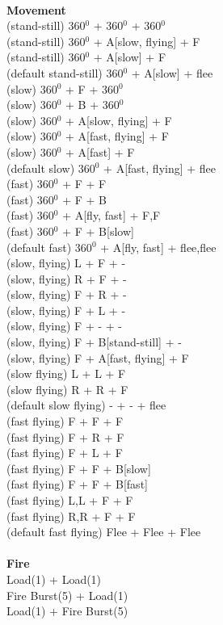 \ \\ {\bf Movement } \\
(stand-still) 360$^0$ + 360$^0$ + 360$^0$ \\
(stand-still) 360$^0$ + A[slow, flying] + F \\
(stand-still) 360$^0$ + A[slow] + F \\
(default stand-still) 360$^0$ + A[slow] + flee \\
(slow) 360$^0$ + F + 360$^0$ \\
(slow) 360$^0$ + B + 360$^0$ \\
(slow) 360$^0$ + A[slow, flying] + F \\
(slow) 360$^0$ + A[fast, flying] + F \\
(slow) 360$^0$ + A[fast] + F \\
(default slow) 360$^0$ + A[fast, flying] + flee \\
(fast) 360$^0$ + F + F \\
(fast) 360$^0$ + F + B \\
(fast) 360$^0$ + A[fly, fast] + F,F \\
(fast) 360$^0$ + F + B[slow] \\
(default fast) 360$^0$ + A[fly, fast] + flee,flee \\
(slow, flying) L + F + - \\
(slow, flying) R + F + - \\
(slow, flying) F + R + - \\
(slow, flying) F + L + - \\
(slow, flying) F + - + - \\
(slow, flying) F + B[stand-still] + - \\
(slow, flying) F + A[fast, flying] + F \\
(slow flying) L + L + F \\
(slow flying) R + R + F \\
(default slow flying) - + - + flee \\
(fast flying) F + F + F \\
(fast flying) F + R + F \\
(fast flying) F + L + F \\
(fast flying) F + F + B[slow] \\
(fast flying) F + F + B[fast] \\
(fast flying) L,L + F + F \\
(fast flying) R,R + F + F \\
(default fast flying) Flee + Flee + Flee \\
\ \\ {\bf Fire } \\
Load(1) + Load(1) \\
Fire Burst(5) + Load(1) \\
Load(1) + Fire Burst(5) \\




